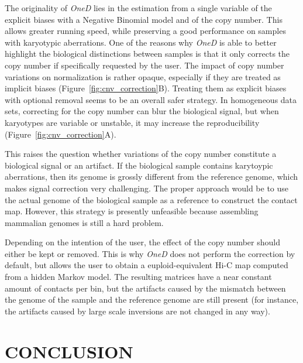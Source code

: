 \documentclass[a4,center,fleqn]{NAR}
\providecommand{\DIFadd}[1]{{\protect\color{red}#1}} %
\providecommand{\DIFdel}[1]{{\protect}}                      %
\providecommand{\DIFaddbegin}{} %
\providecommand{\DIFaddend}{} %
\providecommand{\DIFdelbegin}{} %
\providecommand{\DIFdelend}{} %
\begin{document}
The originality of \textit{OneD} lies in \DIFdelbegin \DIFdel{that it projects all the biases
onto }\DIFdelend \DIFaddbegin \DIFadd{the estimation from }\DIFaddend a single
variable \DIFdelbegin \DIFdel{: the total amount of contacts per bin}\DIFdelend \DIFaddbegin \DIFadd{of the explicit biases with a Negative Binomial model and of the
copy number}\DIFaddend . This allows greater running speed, while preserving a good
performance on samples with karyotypic aberrations. One of the reasons why
\textit{OneD} is able to better highlight the biological distinctions
between samples is that it only corrects the copy number if specifically
requested by the user. The impact of copy number variations on
normalization is rather opaque, especially if they are treated as implicit
biases (Figure~\ref{fig:cnv_correction}\DIFaddbegin \DIFadd{B}\DIFaddend ). Treating them as explicit
biases with optional removal seems to be an overall safer strategy. \DIFaddbegin \DIFadd{In
homogeneous data sets, correcting for the copy number can blur the
biological signal, but when karyotypes are variable or unstable, it may
increase the reproducibility (Figure~\ref{fig:cnv_correction}A).
}\DIFaddend 

This raises the question whether variations of the copy number constitute
a biological signal or an artifact. If the biological sample contains
karytoypic aberrations, then its genome is grossly different from the
reference genome, which makes signal correction very challenging. The
proper approach would be to use the actual genome of the biological sample
as a reference to construct the contact map. However, this strategy is
presently unfeasible because assembling mammalian genomes is still a hard
problem.

Depending on the intention of the user, the effect of the copy number
should either be kept or removed. This is why \textit{OneD} does not
perform the correction by default, but allows the user to obtain a
euploid-equivalent Hi-C map computed from a hidden Markov model. The
resulting matrices have a near constant amount of contacts per bin, but
the artifacts caused by the mismatch between the genome of the sample and
the reference genome are still present (for instance, the artifacts caused
by large scale inversions are not changed in any way).


\section{CONCLUSION}
\end{document}
